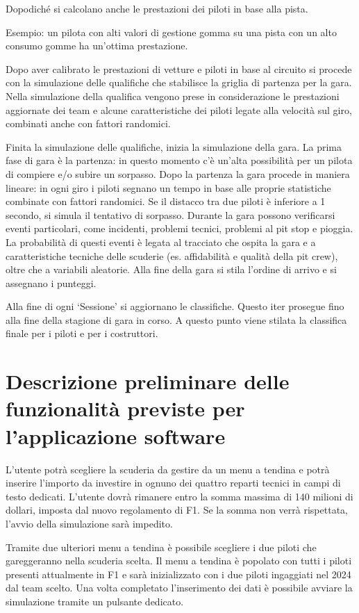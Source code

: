 Dopodiché si calcolano anche le prestazioni dei piloti in base alla pista.

Esempio: un pilota con alti valori di gestione gomma su una pista con un alto consumo gomme ha un’ottima prestazione.

Dopo aver calibrato le prestazioni di vetture e piloti in base al circuito si procede con la simulazione delle qualifiche che stabilisce la griglia di partenza per la gara. Nella simulazione della qualifica vengono prese in considerazione le prestazioni aggiornate dei team e alcune caratteristiche dei piloti legate alla velocità sul giro, combinati anche con fattori randomici.

Finita la simulazione delle qualifiche, inizia la simulazione della gara. La prima fase di gara è la partenza: in questo momento c’è un’alta possibilità per un pilota di compiere e/o subire un sorpasso. Dopo la partenza la gara procede in maniera lineare: in ogni giro i piloti segnano un tempo in base alle proprie statistiche combinate con fattori randomici. Se il distacco tra due piloti è inferiore a 1 secondo, si simula il tentativo di sorpasso. Durante la gara possono verificarsi eventi particolari, come incidenti, problemi tecnici, problemi al pit stop e pioggia. La probabilità di questi eventi è legata al tracciato che ospita la gara e a caratteristiche tecniche delle scuderie (es. affidabilità e qualità della pit crew), oltre che a variabili aleatorie. Alla fine della gara si stila l’ordine di arrivo e si assegnano i punteggi.

Alla fine di ogni ‘Sessione’ si aggiornano le classifiche. Questo iter prosegue fino alla fine della stagione di gara in corso.
A questo punto viene stilata la classifica finale per i piloti e per i costruttori.

\section{Descrizione preliminare delle funzionalità previste per l’applicazione software}
L’utente potrà scegliere la scuderia da gestire da un menu a tendina e potrà inserire l’importo da investire in ognuno dei quattro reparti tecnici in campi di testo dedicati. L’utente dovrà rimanere entro la somma massima di 140 milioni di dollari, imposta dal nuovo regolamento di F1. Se la somma non verrà rispettata, l’avvio della simulazione sarà impedito.

Tramite due ulteriori menu a tendina è possibile scegliere i due piloti che gareggeranno nella scuderia scelta. Il menu a tendina è popolato con tutti i piloti presenti attualmente in F1 e sarà inizializzato con i due piloti ingaggiati nel 2024 dal team scelto.
Una volta completato l’inserimento dei dati è possibile avviare la simulazione tramite un pulsante dedicato.

